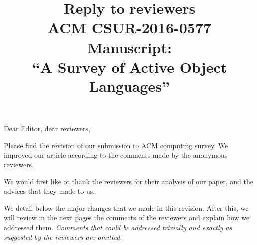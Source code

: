\documentclass{article}
\title{Reply to reviewers\\
ACM CSUR-2016-0577 Manuscript: \\``A Survey of Active Object Languages'' }
\begin{document}
\maketitle
\noindent
Dear Editor, dear reviewers,

Please find the revision of our submission to ACM computing survey. We improved our 
article according to the  comments made by the 
anonymous reviewers.

We would first like ot thank the reviewers for their analysis of our paper, and the 
advices that they made to us.

We detail below the major changes that we made in this revision. After this, we will 
review in the next pages the comments of the reviewers and explain how we addressed them. 
\emph{Comments that could be addressed trivially and exactly as suggested by the 
reviewers are omitted}.
\bigskip
\end{document}
